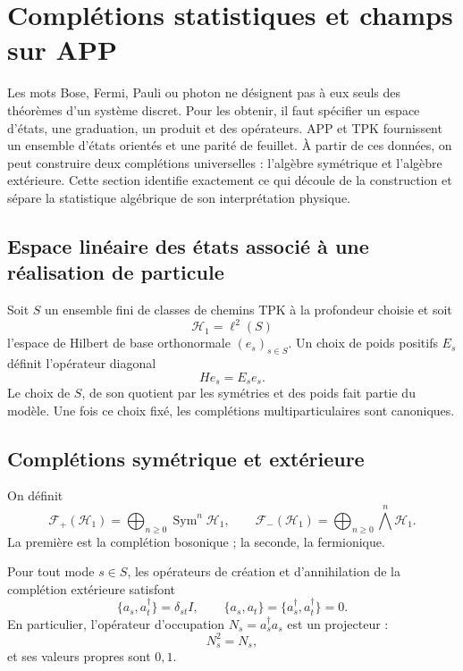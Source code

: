 \chapter{Complétions statistiques et champs sur APP}
\label{chap:completaciones-cuanticas}

Les mots Bose, Fermi, Pauli ou photon ne désignent pas à eux seuls des théorèmes d'un
système discret. Pour les obtenir, il faut spécifier un espace d'états,
une graduation, un produit et des opérateurs. APP et TPK fournissent un ensemble
d'états orientés et une parité de feuillet. À partir de ces données, on peut
construire deux complétions universelles : l'algèbre symétrique et l'algèbre
extérieure. Cette section identifie exactement ce qui découle de la
construction et sépare la statistique algébrique de son interprétation physique.

\section{Espace linéaire des états associé à une réalisation de particule}

Soit \(S\) un ensemble fini de classes de chemins TPK à la profondeur choisie
et soit
\[
 \mathcal H_1=\ell^2(S)
\]
l’espace de Hilbert de base orthonormale \((e_s)_{s\in S}\). Un choix de
poids positifs \(E_s\) définit l’opérateur diagonal
\[
 He_s=E_se_s.
\]
Le choix de \(S\), de son quotient par les symétries et des poids fait partie
du modèle. Une fois ce choix fixé, les complétions multiparticulaires sont canoniques.

\section{Complétions symétrique et extérieure}

On définit
\[
 \mathcal F_+(\mathcal H_1)=
 \bigoplus_{n\geq0}\operatorname{Sym}^n\mathcal H_1,
 \qquad
 \mathcal F_-(\mathcal H_1)=
 \bigoplus_{n\geq0}\bigwedge^n\mathcal H_1.
\]
La première est la complétion bosonique ; la seconde, la fermionique.

\begin{theorem}
Pour tout mode \(s\in S\), les opérateurs de création et d'annihilation de la
complétion extérieure satisfont
\[
 \{a_s,a_t^\dagger\}=\delta_{st}I,
 \qquad
 \{a_s,a_t\}=\{a_s^\dagger,a_t^\dagger\}=0.
\]
En particulier, l’opérateur d’occupation
\(N_s=a_s^\dagger a_s\) est un projecteur :
\[
 N_s^2=N_s,
\]
et ses valeurs propres sont \(0,1\).
\end{theorem}

